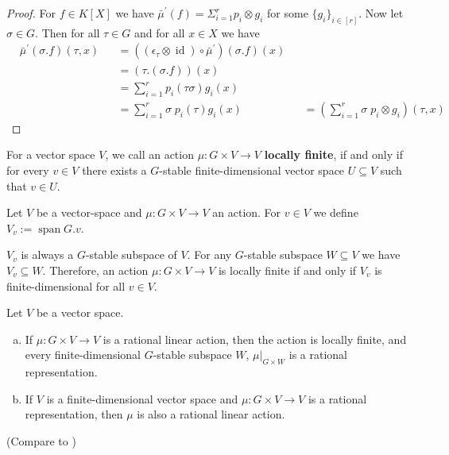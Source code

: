 \begin{proof}
  For $f \in K[X]$ we have $ \bar{\mu}^\prime (f) = \Sigma_{i=1}^r p_i \otimes g_i$ for some $\{g_i\}_{i \in [r]}$.
  Now let $\sigma \in G$.
  Then for all $\tau \in G$ and for all $x \in X$ we have
  \begin{equation}
    \begin{aligned}
      &\bar{\mu}^\prime (\sigma.f) (\tau,x)
      &&=((\epsilon_\tau \otimes \operatorname{id}) \circ \bar{\mu}^\prime) (\sigma.f) (x)\\
      &&&=(\tau.(\sigma.f)) (x)\\
      &&&=\sum_{i=1}^r p_i(\tau\sigma) g_i(x)\\
      &&&=\sum_{i=1}^r \sigma\dot{\phantom{.}}p_i(\tau) g_i(x)
      &&=(\sum_{i=1}^r \sigma \dot{\phantom{.}}p_i \otimes g_i) (\tau,x)
    \end{aligned}
  \end{equation}
\end{proof}

\begin{definition}
  For a vector space $V$, we call an action $\mu \colon G \times V \rightarrow V$ \textbf{locally finite}, if and only if for every $v \in V$ there exists a $G$-stable finite-dimensional vector space $U \subseteq V$ such that $v \in U$.
\end{definition}

\begin{definition}
  Let $V$ be a vector-space and $\mu \colon G \times V \rightarrow V$ an action.
  For $v \in V$ we define $V_v := \operatorname{span} G.v$.
\end{definition}

\begin{remark}
  $V_v$ is always a $G$-stable subspace of $V$.
  For any $G$-stable subspace $W \subseteq V$ we have $V_v \subseteq W$.
  Therefore, an action $\mu \colon G \times V \rightarrow V$ is locally finite if and only if $V_v$ is finite-dimensional for all $v \in V$.
\end{remark}

\begin{proposition}\label{locfin}
  Let $V$ be a vector space.
  \begin{enumerate}[(a)]
  \item If $\mu \colon G \times V \rightarrow V$ is a rational linear action, then the action is locally finite, and every
    finite-dimensional $G$-stable subspace $W$,
    $\left. \mu \right|_{G\times W}$ is a rational
    representation.
  \item If $V$ is a finite-dimensional vector space and $\mu \colon G \times V \rightarrow V$ is a rational representation, then $\mu$ is also a rational linear action.
  \end{enumerate}

  (Compare to \cite[A.1.8, 2.2.5]{DK15})
\end{proposition}

